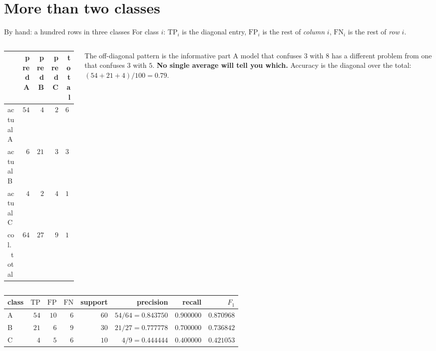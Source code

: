 \documentclass[aspectratio=169]{beamer}
\newcommand{\TP}{\mathrm{TP}}
\newcommand{\FP}{\mathrm{FP}}
\newcommand{\FN}{\mathrm{FN}}
\begin{document}
\section[Multiclass]{More than two classes}
\label{sec:multi}

\begin{frame}[shrink=9]{By hand: a hundred rows in three classes}
For class $i$: $\TP_i$ is the diagonal entry, $\FP_i$ is the rest of
\emph{column} $i$, $\FN_i$ is the rest of \emph{row} $i$.
  \begin{columns}[T]
    \begin{column}{0.42\textwidth}
      \begin{center}\small
      \begin{tabular}{@{}lrrrr@{}}
        \toprule
         & pred A & pred B & pred C & total\\
        \midrule
        actual A & $54$ & $4$ & $2$ & $60$\\
        actual B & $6$ & $21$ & $3$ & $30$\\
        actual C & $4$ & $2$ & $4$ & $10$\\
        \midrule
        col.\ total & $64$ & $27$ & $9$ & $100$\\
        \bottomrule
      \end{tabular}
      \end{center}
    \end{column}
    \begin{column}{0.55\textwidth}
      \begin{block}{The off-diagonal pattern is the informative part}
        \footnotesize A model that confuses $3$ with $8$ has a different
        problem from one that confuses $3$ with $5$. \textbf{No single average
        will tell you which.} Accuracy is the diagonal over the total:
        $(54 + 21 + 4)/100 = \mathbf{0.79}$.
      \end{block}
    \end{column}
  \end{columns}
  \vspace{0.2em}
  \begin{center}\footnotesize
  \begin{tabular}{@{}lrrrrrrr@{}}
    \toprule
    class & $\TP$ & $\FP$ & $\FN$ & support & precision & recall & $F_1$\\
    \midrule
    A & $54$ & $10$ & $6$ & $60$ & $54/64 = 0.843750$ & $0.900000$ &
      $0.870968$\\
    B & $21$ & $6$ & $9$ & $30$ & $21/27 = 0.777778$ & $0.700000$ &
      $0.736842$\\
    C & $4$ & $5$ & $6$ & $10$ & $4/9 = 0.444444$ & $0.400000$ &
      $0.421053$\\
    \bottomrule
  \end{tabular}
  \end{center}
\end{frame}
\end{document}
